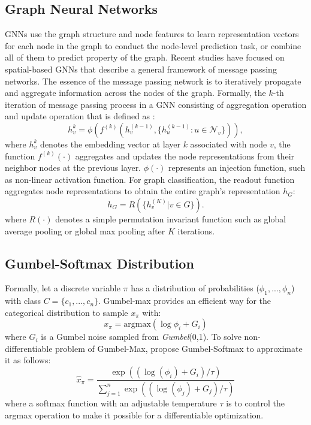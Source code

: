 \documentclass[letterpaper]{article} %
\begin{document}
\subsection{Graph Neural Networks}
GNNs use the graph structure and node features to learn representation vectors for each node in the graph to conduct the node-level prediction task, or combine all of them to predict property of the graph.
Recent studies have focused on spatial-based GNNs that describe a general framework of message passing networks.
The essence of the message passing network is to iteratively propagate and aggregate information across the nodes of the graph. Formally, the $k$-th iteration of message passing process in a GNN consisting of aggregation operation and update operation that is defined as :
\begin{equation}
    h_v^{k} = \phi \left(f^{(k)}(h_v^{(k-1)}, \{ h_u^{(k-1)}: u \in \mathcal{N}_v \})\right),
\end{equation}
where $h^k_v$ denotes the embedding vector at layer $k$ associated with node $v$, the function $f^{(k)}(\cdot)$ aggregates and updates the node representations from their neighbor nodes at the previous layer. $\phi(\cdot)$ represents an injection function, such as non-linear activation function.
For graph classification, the readout function aggregates node representations to obtain the entire graph's representation $h_G$:
\begin{equation}
    h_G = R(\{ h_v^{(K)} | v \in G \}).
\end{equation}
where $R(\cdot)$ denotes a simple permutation invariant function such as global average pooling or global max pooling after $K$ iterations.

\subsection{Gumbel-Softmax Distribution}
Formally, let a discrete variable $\pi$ has a distribution of probabilities (\(\phi_1, ...,\phi_n\)) with class $C=\{c_1,...,c_n\}$.
Gumbel-max \cite{gumbel1954statistical} provides an efficient way for the categorical distribution to sample $x_\pi$ with:
\begin{equation}
x_{\pi}=\mathrm{argmax}(\log\phi_i + G_i)
\end{equation}
where $G_i$ is a Gumbel noise sampled from \textit{Gumbel}(0,1).
To solve non-differentiable problem of Gumbel-Max, \citet{jang2016categorical} propose Gumbel-Softmax to approximate it as follows:
\begin{equation}
\hat{x}_\pi=\frac{\exp((\log(\phi_i)+G_i)/\tau)}{\sum_{j=1}^{n}\exp((\log(\phi_j)+G_j)/\tau)}
\end{equation}
where a softmax function with an adjustable temperature $\tau$ is to control the argmax operation to make it possible for a differentiable optimization.
\end{document}
